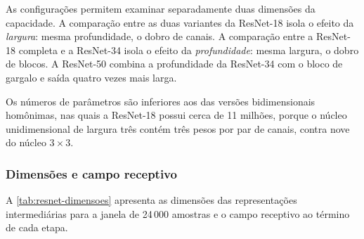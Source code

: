 As configurações permitem examinar separadamente duas dimensões da
capacidade. A comparação entre as duas variantes da ResNet-18 isola o efeito
da \textit{largura}: mesma profundidade, o dobro de canais. A comparação
entre a ResNet-18 completa e a ResNet-34 isola o efeito da
\textit{profundidade}: mesma largura, o dobro de blocos. A ResNet-50 combina
a profundidade da ResNet-34 com o bloco de gargalo e saída quatro vezes mais
larga.

Os números de parâmetros são inferiores aos das versões bidimensionais
homônimas, nas quais a ResNet-18 possui cerca de 11 milhões, porque o núcleo
unidimensional de largura três contém três pesos por par de canais, contra
nove do núcleo $3 \times 3$.

\subsubsection{Dimensões e campo receptivo}
\label{subsubsec:fund-resnet-dimensoes}

A \autoref{tab:resnet-dimensoes} apresenta as dimensões das representações
intermediárias para a janela de 24\,000 amostras e o campo receptivo ao
término de cada etapa.

